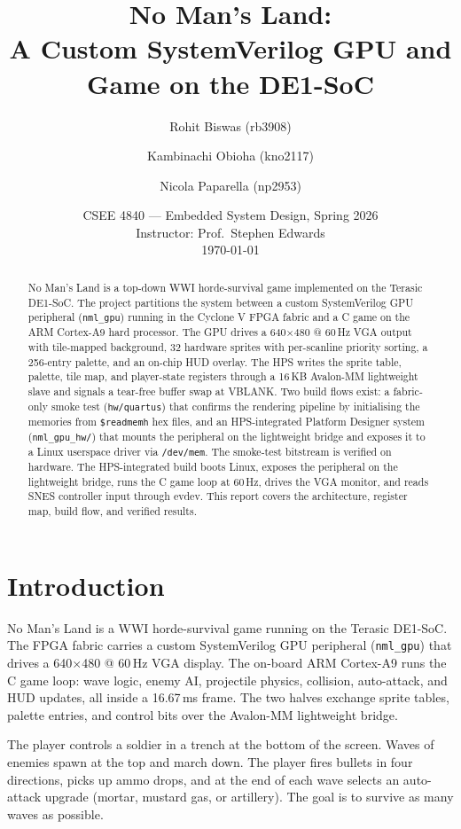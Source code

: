 \documentclass[11pt,letterpaper]{article}
\title{\textbf{No Man's Land:}\\[0.4em]
\large A Custom SystemVerilog GPU and Game on the DE1-SoC}
\author{Rohit Biswas (rb3908) \and Kambinachi Obioha (kno2117) \and Nicola Paparella (np2953)}
\date{CSEE 4840 --- Embedded System Design, Spring 2026 \\
Instructor: Prof.\ Stephen Edwards \\
\today}
\begin{document}
\maketitle

\begin{abstract}
\noindent
No Man's Land is a top-down WWI horde-survival game implemented on the Terasic
DE1-SoC. The project partitions the system between a custom SystemVerilog GPU
peripheral (\texttt{nml\_gpu}) running in the Cyclone V FPGA fabric and a C game
on the ARM Cortex-A9 hard processor. The GPU drives a 640$\times$480 @ 60\,Hz
VGA output with tile-mapped background, 32 hardware sprites with per-scanline
priority sorting, a 256-entry palette, and an on-chip HUD overlay. The HPS
writes the sprite table, palette, tile map, and player-state registers through
a 16\,KB Avalon-MM lightweight slave and signals a tear-free buffer swap at
VBLANK. Two build flows exist: a fabric-only smoke test
(\texttt{hw/quartus}) that confirms the rendering pipeline by initialising the
memories from \texttt{\$readmemh} hex files, and an HPS-integrated Platform
Designer system (\texttt{nml\_gpu\_hw/}) that mounts the peripheral on the
lightweight bridge and exposes it to a Linux userspace driver via
\texttt{/dev/mem}. The smoke-test bitstream is verified on hardware. The
HPS-integrated build boots Linux, exposes the peripheral on the lightweight
bridge, runs the C game loop at 60\,Hz, drives the VGA monitor, and reads SNES
controller input through evdev. This report covers the architecture, register
map, build flow, and verified results.
\end{abstract}

\newpage
\tableofcontents
\newpage

\section{Introduction}

No Man's Land is a WWI horde-survival game running on the Terasic DE1-SoC. The
FPGA fabric carries a custom SystemVerilog GPU peripheral (\texttt{nml\_gpu})
that drives a 640$\times$480 @ 60\,Hz VGA display. The on-board ARM Cortex-A9
runs the C game loop: wave logic, enemy AI, projectile physics, collision,
auto-attack, and HUD updates, all inside a 16.67\,ms frame. The two halves
exchange sprite tables, palette entries, and control bits over the Avalon-MM
lightweight bridge.

The player controls a soldier in a trench at the bottom of the screen. Waves
of enemies spawn at the top and march down. The player fires bullets in four
directions, picks up ammo drops, and at the end of each wave selects an
auto-attack upgrade (mortar, mustard gas, or artillery). The goal is to
survive as many waves as possible.
\end{document}
